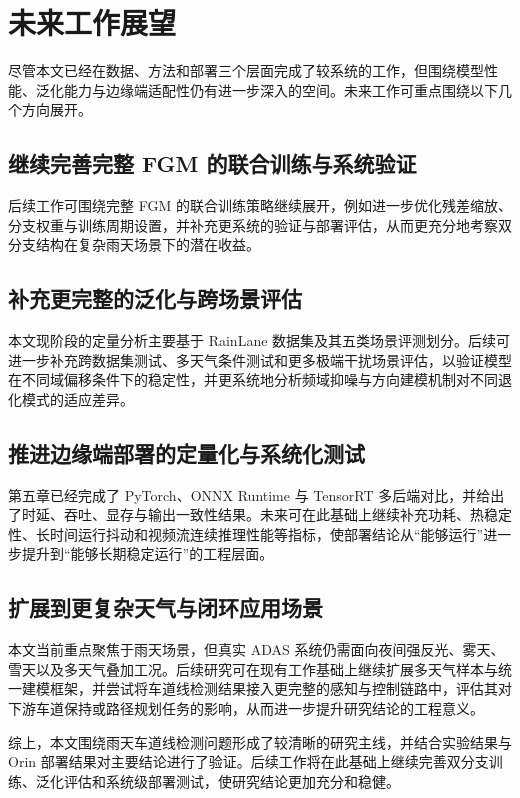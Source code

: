 \section{未来工作展望}
\label{sec:future_work}

尽管本文已经在数据、方法和部署三个层面完成了较系统的工作，但围绕模型性能、泛化能力与边缘端适配性仍有进一步深入的空间。未来工作可重点围绕以下几个方向展开。

\subsection{继续完善完整 FGM 的联合训练与系统验证}

后续工作可围绕完整 FGM 的联合训练策略继续展开，例如进一步优化残差缩放、分支权重与训练周期设置，并补充更系统的验证与部署评估，从而更充分地考察双分支结构在复杂雨天场景下的潜在收益。

\subsection{补充更完整的泛化与跨场景评估}

本文现阶段的定量分析主要基于 RainLane 数据集及其五类场景评测划分。后续可进一步补充跨数据集测试、多天气条件测试和更多极端干扰场景评估，以验证模型在不同域偏移条件下的稳定性，并更系统地分析频域抑噪与方向建模机制对不同退化模式的适应差异。

\subsection{推进边缘端部署的定量化与系统化测试}

第五章已经完成了 PyTorch、ONNX Runtime 与 TensorRT 多后端对比，并给出了时延、吞吐、显存与输出一致性结果。未来可在此基础上继续补充功耗、热稳定性、长时间运行抖动和视频流连续推理性能等指标，使部署结论从“能够运行”进一步提升到“能够长期稳定运行”的工程层面。

\subsection{扩展到更复杂天气与闭环应用场景}

本文当前重点聚焦于雨天场景，但真实 ADAS 系统仍需面向夜间强反光、雾天、雪天以及多天气叠加工况。后续研究可在现有工作基础上继续扩展多天气样本与统一建模框架，并尝试将车道线检测结果接入更完整的感知与控制链路中，评估其对下游车道保持或路径规划任务的影响，从而进一步提升研究结论的工程意义。

综上，本文围绕雨天车道线检测问题形成了较清晰的研究主线，并结合实验结果与 Orin 部署结果对主要结论进行了验证。后续工作将在此基础上继续完善双分支训练、泛化评估和系统级部署测试，使研究结论更加充分和稳健。
